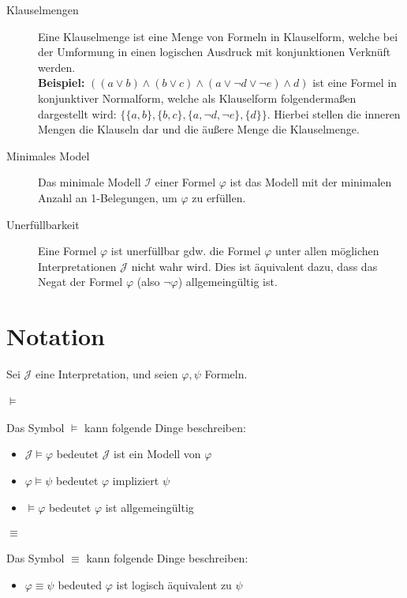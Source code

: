 \begin{description}
			\item[Klauselmengen] Eine Klauselmenge ist eine Menge von Formeln in Klauselform, welche bei der Umformung in einen logischen Ausdruck mit konjunktionen Verknüft werden. \\ \textbf{Beispiel:} $ ((a \lor b) \land (b \lor c) \land (a \lor \lnot d \lor \lnot e) \land d) $ ist eine Formel in konjunktiver Normalform, welche als Klauselform folgendermaßen dargestellt wird: $ \{ \{ a, b \}, \{ b, c \}, \{ a, \lnot d, \lnot e \}, \{ d \} \} $. Hierbei stellen die inneren Mengen die Klauseln dar und die äußere Menge die Klauselmenge.
			\item[Minimales Model] Das minimale Modell $ \mathcal{I} $ einer Formel $ \varphi $ ist das Modell mit der minimalen Anzahl an 1-Belegungen, um $ \varphi $ zu erfüllen.
			\item[Unerfüllbarkeit] Eine Formel $ \varphi $ ist unerfüllbar gdw. die Formel $ \varphi $ unter allen möglichen Interpretationen $ \mathcal{J} $ nicht wahr wird. Dies ist äquivalent dazu, dass das Negat der Formel $ \varphi $ (also $ \lnot \varphi $) allgemeingültig ist.
		\end{description}

	\section{Notation}
		Sei $ \mathcal{J} $ eine Interpretation, und seien $ \varphi, \psi $ Formeln.

		\paragraph{$ \models $}
			Das Symbol $ \models $ kann folgende Dinge beschreiben:
			\begin{itemize}
				\item $ \mathcal{J} \models \varphi $ bedeutet $ \mathcal{J} $ ist ein Modell von $ \varphi $
				\item $ \varphi \models \psi $ bedeutet $ \varphi $ impliziert $ \psi $
				\item $ \models \varphi $ bedeutet $ \varphi $ ist allgemeingültig
			\end{itemize}

		\paragraph{$ \equiv $}
			Das Symbol $ \equiv $ kann folgende Dinge beschreiben:
			\begin{itemize}
				\item $ \varphi \equiv \psi $ bedeuted $ \varphi $ ist logisch äquivalent zu $ \psi $
			\end{itemize}

